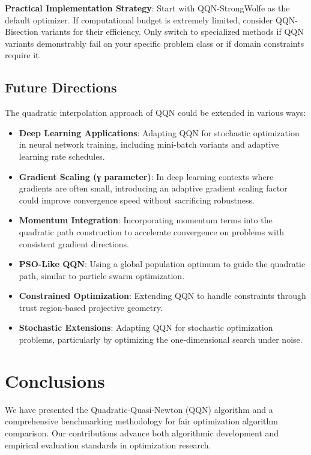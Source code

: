 \textbf{Practical Implementation Strategy}: Start with QQN-StrongWolfe as the default optimizer. If computational budget is extremely limited, consider QQN-Bisection variants for their efficiency. Only switch to specialized methods if QQN variants demonstrably fail on your specific problem class or if domain constraints require it.

\hypertarget{future-directions}{%
\subsection{Future Directions}\label{future-directions}}

The quadratic interpolation approach of QQN could be extended in various ways:

\begin{itemize}
\tightlist
\item
  \textbf{Deep Learning Applications}: Adapting QQN for stochastic optimization in neural network training, including mini-batch variants and adaptive learning rate schedules.
\item
  \textbf{Gradient Scaling (γ parameter)}: In deep learning contexts where gradients are often small, introducing an adaptive gradient scaling factor could improve convergence speed without sacrificing robustness.
\item
  \textbf{Momentum Integration}: Incorporating momentum terms into the quadratic path construction to accelerate convergence on problems with consistent gradient directions.
\item
  \textbf{PSO-Like QQN}: Using a global population optimum to guide the quadratic path, similar to particle swarm optimization.
\item
  \textbf{Constrained Optimization}: Extending QQN to handle constraints through trust region-based projective geometry.
\item
  \textbf{Stochastic Extensions}: Adapting QQN for stochastic optimization problems, particularly by optimizing the one-dimensional search under noise.
\end{itemize}

\hypertarget{conclusions}{%
\section{Conclusions}\label{conclusions}}

We have presented the Quadratic-Quasi-Newton (QQN) algorithm and a comprehensive benchmarking methodology for fair optimization algorithm comparison. Our contributions advance both algorithmic development and empirical evaluation standards in optimization research.

